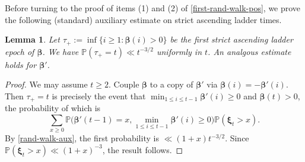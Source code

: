\documentclass[11pt,reqno]{amsart}
\numberwithin{equation}{section}
\newtheorem{lemma}[theorem]{Lemma}
\theoremstyle{definition}
\theoremstyle{remark}
\newcommand{\mb}{\mathbb}
\def\boldbeta{\boldsymbol\beta}
\def\boldxi{\boldsymbol\xi}
\renewcommand{\le}{\leqslant}
\renewcommand{\ge}{\geqslant}
\begin{document}
Before turning to the proof of items (1) and (2) of \cref{first-rand-walk-pos}, we prove the following (standard) auxiliary estimate on strict ascending ladder times.

\begin{lemma}
\label{first-ascending-ladder} Let $\tau_+ := \inf\{ i \ge 1 : \boldbeta(i) > 0\}$ be the first strict ascending ladder epoch of $\boldbeta$. We have $\mb{P}(\tau_+ = t) \ll t^{-3/2}$ uniformly in $t$. An analgous estimate holds for $\boldbeta'$.
\end{lemma}
\begin{proof} We may assume $t \ge 2$. Couple $\boldbeta$ to a copy of $\boldbeta'$ via $\boldbeta(i) = -\boldbeta'(i)$. Then $\tau_+ = t$ is precisely the event that $\min_{1 \le i \le t - 1} \boldbeta'(i) \ge 0$ and $\boldbeta(t) > 0$, the probability of which is
\[ \sum_{x \ge 0} \mb{P}\big( \boldbeta'(t - 1) = x, \min_{1 \le i \le t - 1} \boldbeta'(i) \ge 0\big) \mb{P}(\boldxi_t > x).\] By \cref{rand-walk-aux}, the first probability is $\ll (1 + x) t^{-3/2}$. Since $\mb{P}(\boldxi_t > x) \ll (1 + x)^{-3}$, the result follows.
\end{proof}
\end{document}
